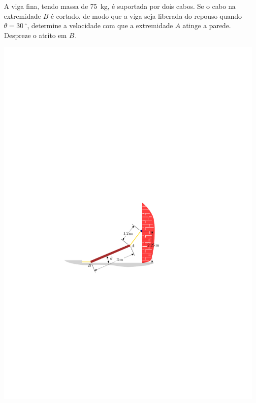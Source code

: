 \item A viga fina, tendo massa de \SI{75}{\kilogram}, é suportada por dois cabos. Se o cabo na extremidade $B$ é cortado, de modo que a viga seja liberada do repouso quando $\theta=\SI{30}{^{\circ}}$, determine a velocidade com que a extremidade $A$ atinge a parede. Despreze o atrito em $B$.

\begin{flushright}
	\includegraphics[scale=1.2]{../../images/draw_4_1}
\end{flushright}